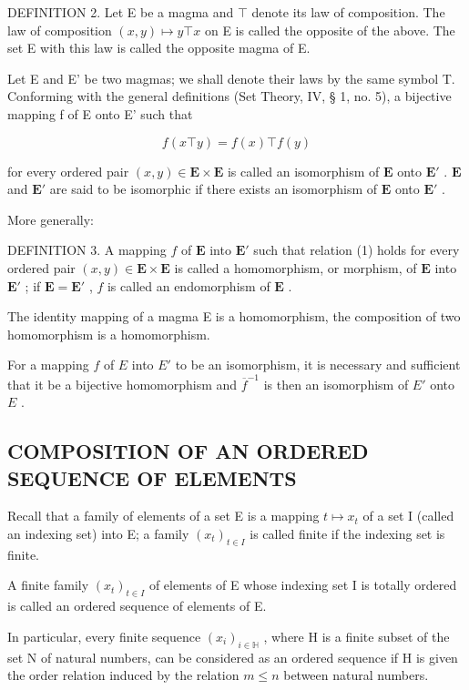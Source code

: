 DEFINITION 2. Let E be a magma and \(\top\) denote its law of composition. The law of composition \((x, y) \mapsto y \top x\) on E is called the opposite of the above. The set E with this law is called the opposite magma of E.

Let E and E' be two magmas; we shall denote their laws by the same symbol T. Conforming with the general definitions (Set Theory, IV, § 1, no. 5), a bijective mapping f of E onto E' such that

\[
f (x \top y) = f (x) \top f (y)\tag{1}
\]

for every ordered pair \((x, y) \in \mathbf{E} \times \mathbf{E}\) is called an isomorphism of \(\mathbf{E}\) onto \(\mathbf{E}'\) . \(\mathbf{E}\) and \(\mathbf{E}'\) are said to be isomorphic if there exists an isomorphism of \(\mathbf{E}\) onto \(\mathbf{E}'\) .

More generally:

DEFINITION 3. A mapping \(f\) of \(\mathbf{E}\) into \(\mathbf{E}'\) such that relation (1) holds for every ordered pair \((x, y) \in \mathbf{E} \times \mathbf{E}\) is called a homomorphism, or morphism, of \(\mathbf{E}\) into \(\mathbf{E}'\) ; if \(\mathbf{E} = \mathbf{E}'\) , \(f\) is called an endomorphism of \(\mathbf{E}\) .

The identity mapping of a magma E is a homomorphism, the composition of two homomorphism is a homomorphism.

For a mapping \(f\) of \(E\) into \(E'\) to be an isomorphism, it is necessary and sufficient that it be a bijective homomorphism and \(\overline{f}^{-1}\) is then an isomorphism of \(E'\) onto \(E\) .

\subsection{COMPOSITION OF AN ORDERED SEQUENCE OF ELEMENTS}

Recall that a family of elements of a set E is a mapping \(t \mapsto x_{t}\) of a set I (called an indexing set) into E; a family \((x_{t})_{t \in I}\) is called finite if the indexing set is finite.

A finite family \((x_{t})_{t\in I}\) of elements of E whose indexing set I is totally ordered is called an ordered sequence of elements of E.

In particular, every finite sequence \((x_{i})_{i\in\mathbb{H}}\) , where H is a finite subset of the set N of natural numbers, can be considered as an ordered sequence if H is given the order relation induced by the relation \(m \leqslant n\) between natural numbers.

